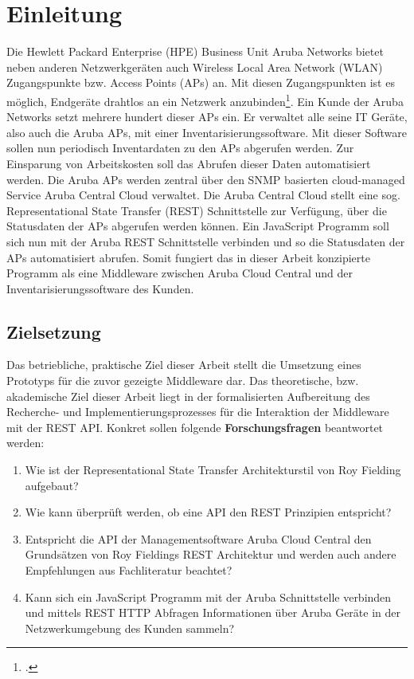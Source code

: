 \chapter{Einleitung}

Die Hewlett Packard Enterprise (HPE) Business Unit Aruba Networks bietet neben anderen Netzwerkgeräten auch Wireless Local Area Network (WLAN) Zugangspunkte bzw. Access Points (APs) an. Mit diesen Zugangspunkten ist es möglich, Endgeräte drahtlos an ein Netzwerk anzubinden\footcite[Vgl. ][]{hewlett_packard_enterprise_development_lp_access_2021}. Ein Kunde der Aruba Networks setzt mehrere hundert dieser APs ein. Er verwaltet alle seine IT Geräte, also auch die Aruba APs, mit einer Inventarisierungssoftware. Mit dieser Software sollen nun periodisch Inventardaten zu den APs abgerufen werden. Zur Einsparung von Arbeitskosten soll das Abrufen dieser Daten automatisiert werden. Die Aruba APs werden zentral über den SNMP basierten cloud-managed Service Aruba Central Cloud verwaltet. Die Aruba Central Cloud stellt eine sog. Representational State Transfer (REST) Schnittstelle zur Verfügung, über die Statusdaten der APs abgerufen werden können. Ein JavaScript Programm soll sich nun mit der Aruba REST Schnittstelle verbinden und so die Statusdaten der APs automatisiert abrufen. Somit fungiert das in dieser Arbeit konzipierte Programm als eine Middleware zwischen Aruba Cloud Central und der Inventarisierungssoftware des Kunden. 

\section{Zielsetzung}

Das betriebliche, praktische Ziel dieser Arbeit stellt die Umsetzung eines Prototyps für die zuvor gezeigte Middleware dar. Das theoretische, bzw. akademische Ziel dieser Arbeit liegt in der formalisierten Aufbereitung des Recherche- und Implementierungsprozesses für die Interaktion der Middleware mit der REST API. Konkret sollen folgende \textbf{Forschungsfragen} beantwortet werden:

\begin{enumerate}
    \item Wie ist der Representational State Transfer Architekturstil von Roy Fielding aufgebaut?
    \item Wie kann überprüft werden, ob eine API den REST Prinzipien entspricht?
    \item Entspricht die API der Managementsoftware Aruba Cloud Central den Grundsätzen von Roy Fieldings REST Architektur und werden auch andere Empfehlungen aus Fachliteratur beachtet?
    \item Kann sich ein JavaScript Programm mit der Aruba Schnittstelle verbinden und mittels REST HTTP Abfragen Informationen über Aruba Geräte in der Netzwerkumgebung des Kunden sammeln?
\end{enumerate}

